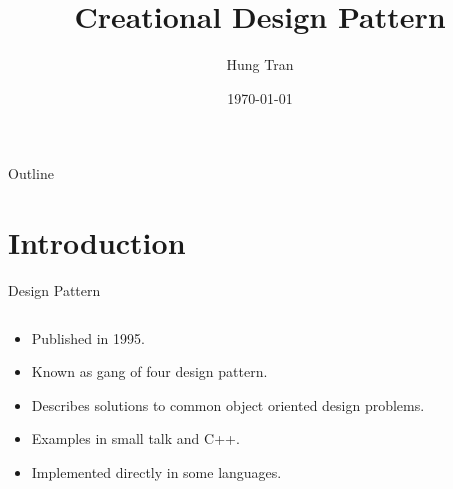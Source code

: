\documentclass[13pt]{beamer}
\title[Design Pattern]{Creational Design Pattern}
\author{Hung Tran}
\institute{Fpt software}
\date{\today}
\begin{document}
\begin{frame}
  \titlepage
\end{frame}

\begin{frame}{Outline}
  \tableofcontents
\end{frame}

\section{Introduction}

\begin{frame}{Design Pattern}

\begin{columns}[T]
\begin{column}{.5\textwidth}                                          
	\begin{itemize}
		\setlength\itemsep{1em}  
		\item Published in 1995.
		\item Known as gang of four design pattern.
		\item Describes solutions to common object oriented design problems.
		\item Examples in small talk and C++.
		\item Implemented directly in some languages.
	\end{itemize}                                
\end{column}


\end{columns}
\end{frame}
\end{document}
